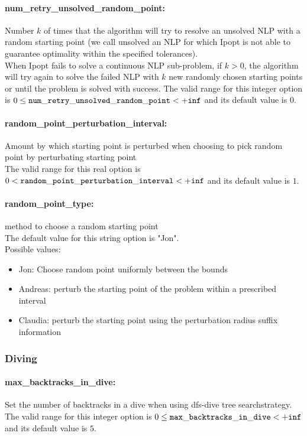 \paragraph{num\_retry\_unsolved\_random\_point:} Number $k$ of times that the algorithm will try to resolve an unsolved NLP with a random starting point (we call unsolved an NLP for which Ipopt is not able to guarantee optimality within the specified tolerances). $\;$ \\
 When Ipopt fails to solve a continuous NLP
sub-problem, if $k > 0$, the algorithm will try
again to solve the failed NLP with $k$ new
randomly chosen starting points  or until the
problem is solved with success. The valid range for this integer option is
$0 \le {\tt num\_retry\_unsolved\_random\_point } <  {\tt +inf}$
and its default value is $0$.


\paragraph{random\_point\_perturbation\_interval:} Amount by which starting point is perturbed when choosing to pick random point by perturbating starting point $\;$ \\
 The valid range for this real option is 
$0 <  {\tt random\_point\_perturbation\_interval } <  {\tt +inf}$
and its default value is $1$.


\paragraph{random\_point\_type:} method to choose a random starting point $\;$ \\
The default value for this string option is "Jon".
\\ 
Possible values:
\begin{itemize}
   \item Jon: Choose random point uniformly between the bounds
   \item Andreas: perturb the starting point of the problem
within a prescribed interval
   \item Claudia: perturb the starting point using the
perturbation radius suffix information
\end{itemize}


\subsubsection{Diving}
\label{sec:Diving_options}
\paragraph{max\_backtracks\_in\_dive:} Set the number of backtracks in a dive when using dfs-dive tree searchstrategy. $\;$ \\
 The valid range for this integer option is
$0 \le {\tt max\_backtracks\_in\_dive } <  {\tt +inf}$
and its default value is $5$.


